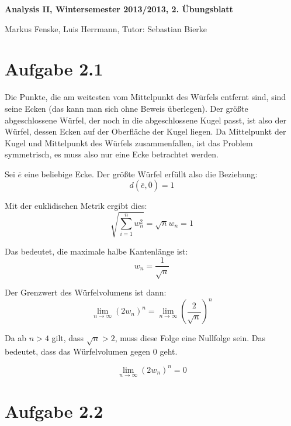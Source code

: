 \documentclass[a4paper,german,12pt,smallheadings]{scrartcl}
\begin{document}
\begin{center}
\bfseries %
\sffamily %
\vspace{-40pt}
Analysis II, Wintersemester 2013/2013, 2. Übungsblatt

Markus Fenske, Luis Herrmann, Tutor: Sebastian Bierke
\vspace{-10pt}
\end{center}

\section*{Aufgabe 2.1}
Die Punkte, die am weitesten vom Mittelpunkt des Würfels entfernt sind, sind
seine Ecken (das kann man sich ohne Beweis überlegen). Der größte
abgeschlossene Würfel, der noch in die abgeschlossene Kugel passt, ist also der
Würfel, dessen Ecken auf der Oberfläche der Kugel liegen. Da Mittelpunkt der
Kugel und Mittelpunkt des Würfels zusammenfallen, ist das Problem symmetrisch,
es muss also nur eine Ecke betrachtet werden.

Sei $\overline{e}$ eine beliebige Ecke. Der größte Würfel erfüllt also die Beziehung:
\begin{equation*}
  d(\overline{e},\overline{0}) = 1
\end{equation*}

Mit der euklidischen Metrik ergibt dies:
\begin{equation*}
  \sqrt{\sum_{i=1}^n w_n^2} = \sqrt{n} w_n = 1
\end{equation*}

Das bedeutet, die maximale halbe Kantenlänge ist:
\begin{equation*}
  w_n = \frac{1}{\sqrt{n}}
\end{equation*}

Der Grenzwert des Würfelvolumens ist dann:
\begin{equation*}
  \lim_{n \to \infty} (2w_n)^n = \lim_{n \to \infty} \left(\frac{2}{\sqrt{n}}\right)^n
\end{equation*}

Da ab $n > 4$ gilt, dass $\sqrt{n} > 2$, muss diese Folge eine
Nullfolge sein. Das bedeutet, dass das Würfelvolumen gegen 0 geht.

\begin{equation*}
  \lim_{n \to \infty} (2w_n)^n = 0
\end{equation*}

\section*{Aufgabe 2.2}
\end{document}
